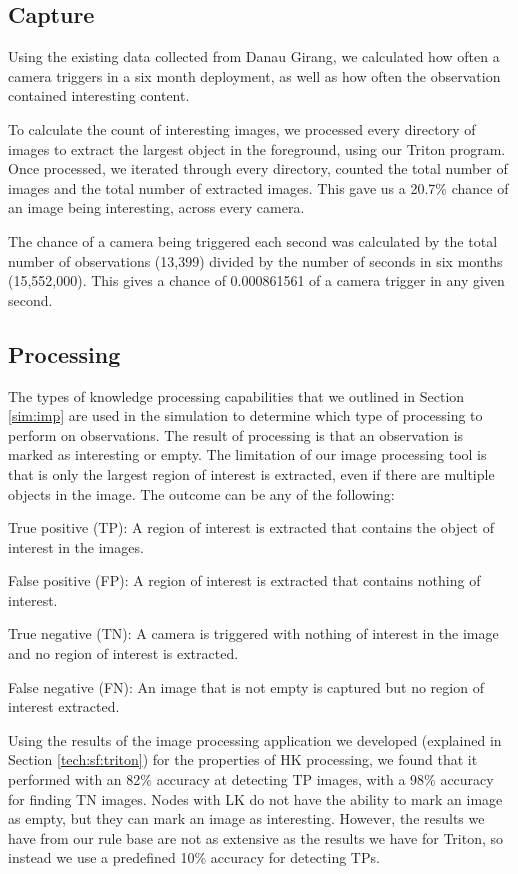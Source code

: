 \subsection{Capture}
	Using the existing data collected from Danau Girang, we calculated how often a camera triggers in a six month deployment, as well as how often the observation contained interesting content. 
	
	To calculate the count of interesting images, we processed every directory of images to extract the largest object in the foreground, using our Triton program. Once processed, we iterated through every directory, counted the total number of images and the total number of extracted images. This gave us a 20.7\% chance of an image being interesting, across every camera.
	
	The chance of a camera being triggered each second was calculated by the total number of observations (13,399) divided by the number of seconds in six months (15,552,000). This gives a chance of 0.000861561 of a camera trigger in any given second.
	
\subsection{Processing}
	The types of knowledge processing capabilities that we outlined in Section \ref{sim:imp} are used in the simulation to determine which type of processing to perform on observations. The result of processing is that an observation is marked as interesting or empty. The limitation of our image processing tool is that is only the largest region of interest is extracted, even if there are multiple objects in the image. The outcome can be any of the following:
		\begin{description}
			\item True positive (TP): A region of interest is extracted that contains the object of interest in the images.
			\item False positive (FP): A region of interest is extracted that contains nothing of interest.
			\item True negative (TN): A camera is triggered with nothing of interest in the image and no region of interest is extracted.
			\item False negative (FN): An image that is not empty is captured but no region of interest extracted.
		\end{description}
	
	Using the results of the image processing application we developed (explained in Section \ref{tech:sf:triton}) for the properties of HK processing, we found that it performed with an 82\% accuracy at detecting TP images, with a 98\% accuracy for finding TN images. Nodes with LK do not have the ability to mark an image as empty, but they can mark an image as interesting. However, the results we have from our rule base are not as extensive as the results we have for Triton, so instead we use a predefined 10\% accuracy for detecting TPs.
	


